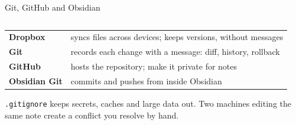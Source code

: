 \begin{frame}{Git, GitHub and Obsidian}
  \begin{columns}[T,onlytextwidth]
  \end{columns}
  \vspace{0.2em}
  \renewcommand{\arraystretch}{1.12}
  {\small
  \begin{tabularx}{\linewidth}{>{\bfseries\color{ink}}l >{\leavevmode\color{dark}}X}
  Dropbox & syncs files across devices; keeps versions, without messages\\
  Git & records each change with a message: diff, history, rollback\\
  GitHub & hosts the repository; make it private for notes\\
  Obsidian Git & commits and pushes from inside Obsidian\\
  \end{tabularx}}
  \vspace{0.25em}
  {\scriptsize\color{muted} \texttt{.gitignore} keeps secrets, caches and large data out. Two machines editing the same note create a conflict you resolve by hand.\par}
\end{frame}
